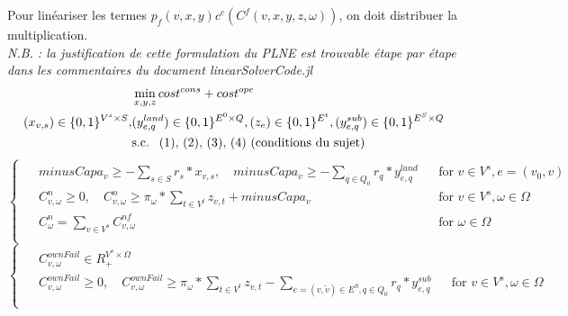 \documentclass[a4paper,12pt]{article}
\begin{document}
    Pour linéariser les termes $p_f(v, x, y) c^c(C^f(v, x, y, z ,\omega))$, on doit distribuer la multiplication.\\
    \textit{N.B. : la justification de cette formulation du PLNE est trouvable étape par étape dans les commentaires du document linearSolverCode.jl} 
    \begin{align*}
        & \min_{x,y,z} cost^{cons}+ cost ^{ope} \\
         (x_{v,s}) \in \{0,1\}^{V^{s} \times S}, & (y_{e,q}^{land}) \in \{0,1\}^{E^0 \times Q}, (z_{e})\in \{0,1\}^{E^t}, (y_{e,q}^{sub}) \in \{0,1\}^{E^S\times Q}\\
        & \text{s.c. \text{ (1), (2), (3), (4)  (conditions du sujet)}} 
    \end{align*}
    \begin{equation}
        \begin{cases}
            \begin{alignedat}{2}
                & minusCapa_v \geq - \sum_{s \in S} r_s * x_{v,s}, \quad minusCapa_v \geq - \sum_{q \in Q_0} r_q * y_{e,q}^{land}  &&  \text{for } v \in V^s, e = (v_0, v)  \\
                & C_{v,\omega}^{n} \geq 0, \quad C_{v,\omega}^{n} \geq \pi_\omega * \sum_{t \in V^t} z_{v,t} + minusCapa_v  &&  \text{for } v \in V^s, \omega \in \Omega  \\
                & C^n_{\omega} = \sum_{v \in V^s} C_{v,\omega}^{nf} && \text{for } \omega \in \Omega \\
            \end{alignedat}
        \end{cases}
    \end{equation}
    \begin{equation}
        \begin{cases}
            \begin{alignedat}{2}
                & C_{v, \omega}^{ownFail} \in R^{V^s \times \Omega}_+ \\
                & C_{v, \omega}^{ownFail} \geq 0, \quad C_{v, \omega}^{ownFail} \geq \pi_\omega * \sum_{t \in V^t} z_{v,t} - \sum_{e = (v, \tilde{v}) \in E^S , q \in Q_0} r_q * y_{e,q}^{sub}  &&  \text{for } v \in V^s, \omega \in \Omega \\
            \end{alignedat}
        \end{cases}
    \end{equation}
\end{document}
